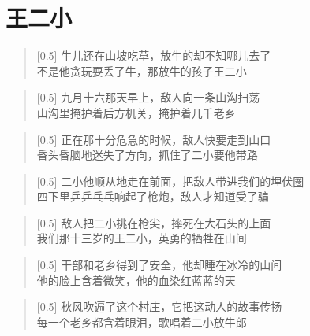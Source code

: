 \documentclass[12pt,UTF-8,openany]{ctexbook}
\begin{document}
\chapter{王二小}

\begin{large}
    
    \begin{verse}[0.5\linewidth]
        牛儿还在山坡吃草，放牛的却不知哪儿去了 \\
        不是他贪玩耍丢了牛，那放牛的孩子王二小
    \end{verse}
    
    
    \begin{verse}[0.5\linewidth]
        九月十六那天早上，敌人向一条山沟扫荡 \\
        山沟里掩护着后方机关，掩护着几千老乡
    \end{verse}
    
    
    \begin{verse}[0.5\linewidth]
        正在那十分危急的时候，敌人快要走到山口 \\
        昏头昏脑地迷失了方向，抓住了二小要他带路
    \end{verse}
    
    
    \begin{verse}[0.5\linewidth]
        二小他顺从地走在前面，把敌人带进我们的埋伏圈 \\
        四下里乒乒乓乓响起了枪炮，敌人才知道受了骗
    \end{verse}
    
    
    \begin{verse}[0.5\linewidth]
        敌人把二小挑在枪尖，摔死在大石头的上面 \\
        我们那十三岁的王二小，英勇的牺牲在山间
    \end{verse}
    
    
    \begin{verse}[0.5\linewidth]
        干部和老乡得到了安全，他却睡在冰冷的山间 \\
        他的脸上含着微笑，他的血染红蓝蓝的天
    \end{verse}
    
    
    \begin{verse}[0.5\linewidth]
        秋风吹遍了这个村庄，它把这动人的故事传扬 \\
        每一个老乡都含着眼泪，歌唱着二小放牛郎
    \end{verse}
    
\end{large}
\end{document}
